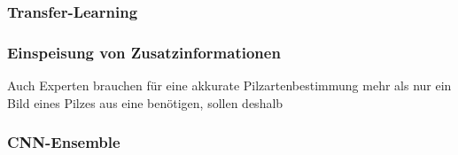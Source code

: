 \subsubsection{Transfer-Learning}


\subsubsection{Einspeisung von Zusatzinformationen}
Auch Experten brauchen für eine akkurate Pilzartenbestimmung mehr als nur ein Bild eines Pilzes aus eine benötigen, sollen deshalb 

\subsubsection{CNN-Ensemble}